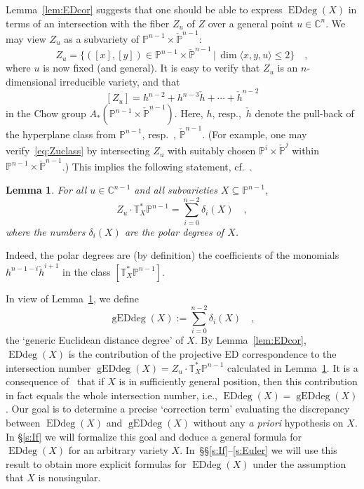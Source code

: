 \documentclass[11pt]{amsart}
\newtheorem{lemma}[theorem]{Lemma}
\numberwithin{equation}{section}
\newcommand{\Cbb}{{\mathbb{C}}}
\newcommand{\Pbb}{{\mathbb{P}}}
\newcommand{\cPbb}{{\check\Pbb}}
\newcommand{\Tbb}{{\mathbb{T}}}
\newcommand{\ch}{\check h}
\DeclareMathOperator{\Edd}{EDdeg}
\DeclareMathOperator{\gEdd}{gEDdeg}
\begin{document}
Lemma~\ref{lem:EDcor} suggests that one should be able to express $\Edd(X)$ 
in terms of an intersection with the fiber $Z_u$ of $Z$ over a general point $u\in \Cbb^n$.
We may view $Z_u$ as a subvariety of $\Pbb^{n-1}\times \cPbb^{n-1}$:
\[
Z_u = \{ ([x],[y])\in \Pbb^{n-1}\times \cPbb^{n-1}\,|\, \dim \langle x,y,u\rangle \le  2\}\quad,
\]
where $u$ is now fixed (and general). It is easy to verify that $Z_u$ is an $n$-dimensional
irreducible variety, and that
\begin{equation}\label{eq:Zuclass}
[Z_u]=h^{n-2}+h^{n-3} \ch + \cdots + \ch^{n-2}
\end{equation}
in the Chow group $A_*(\Pbb^{n-1}\times \cPbb^{n-1})$. Here, $h$, resp.,~$\ch$ denote 
the pull-back of the hyperplane class from $\Pbb^{n-1}$, resp.~, $\cPbb^{n-1}$.
(For example, one may verify~\eqref{eq:Zuclass} by intersecting $Z_u$ with suitably
chosen $\Pbb^i\times \cPbb^j$ within $\Pbb^{n-1}\times \cPbb^{n-1}$.)
This implies the following statement, cf.~\cite[Proposition~5.4]{MR3451425}.

\begin{lemma}\label{eq:Zuint}
For all $u\in \Cbb^{n-1}$ and all subvarieties $X\subseteq \Pbb^{n-1}$,
\[
Z_u\cdot \Tbb^*_X\Pbb^{n-1} = \sum_{i=0}^{n-2} \delta_i(X)\quad,
\]
where the numbers $\delta_i(X)$ are the {\em polar degrees\/} of $X$.
\end{lemma}

Indeed, the polar degrees are (by definition) the coefficients of the monomials
$h^{n-1-i} \ch^{i+1}$ in the class $[\Tbb^*_X\Pbb^{n-1}]$. 

In view of Lemma~\ref{eq:Zuint}, we define
\[
\gEdd(X):=\sum_{i=0}^{n-2} \delta_i(X)\quad,
\]
the `generic Euclidean distance degree' of $X$. 
By Lemma~\ref{lem:EDcor}, $\Edd(X)$ is the contribution of the projective ED
correspondence to the intersection number $\gEdd(X)=Z_u\cdot \Tbb^*_X\Pbb^{n-1}$
calculated in Lemma~\ref{eq:Zuint}. It is a consequence of~\cite[Proposition~5.4]{MR3451425} 
that if $X$ is in sufficiently general position, then this contribution in fact equals the whole 
intersection number, i.e., $\Edd(X) =\gEdd(X)$.
Our goal is to determine a precise `correction term' evaluating the discrepancy between
$\Edd(X)$ and $\gEdd(X)$ without any {\em a priori\/} hypothesis on $X$.
In \S\ref{s:If} we will formalize this goal and deduce a general 
formula for $\Edd(X)$
for an arbitrary variety $X$. In~\S\S\ref{s:If}--\ref{s:Euler} we will use this
result to obtain more explicit formulas for $\Edd(X)$ under the assumption that $X$
is nonsingular. 
\end{document}
